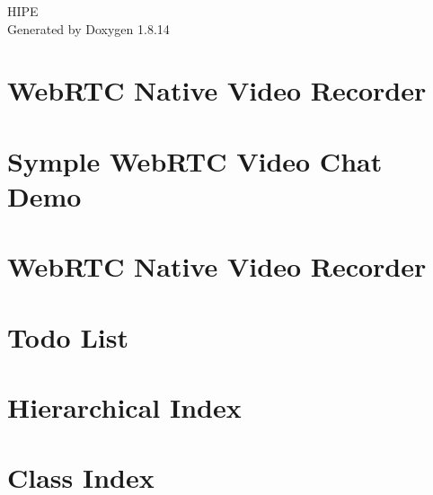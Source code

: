 \documentclass[twoside]{book}
\newcommand{\+}{\discretionary{\mbox{\scriptsize$\hookleftarrow$}}{}{}}
\newcommand{\clearemptydoublepage}{%
  \newpage{\pagestyle{empty}\cleardoublepage}%
}
\begin{document}
\hypersetup{pageanchor=false,
             bookmarksnumbered=true,
             pdfencoding=unicode
            }
\begin{titlepage}
\vspace*{7cm}
\begin{center}%
{\Large H\+I\+PE }\\
\vspace*{1cm}
{\large Generated by Doxygen 1.8.14}\\
\end{center}
\end{titlepage}
\clearemptydoublepage
{}
\tableofcontents
\clearemptydoublepage
{}
\hypersetup{pageanchor=true}

\chapter{Web\+R\+TC Native Video Recorder}
\label{md_source_webrtcrecorder__r_e_a_d_m_e}

\chapter{Symple Web\+R\+TC Video Chat Demo}
\label{md_source_webrtcstreamer_client__r_e_a_d_m_e}

\chapter{Web\+R\+TC Native Video Recorder}
\label{md_source_webrtcstreamer__r_e_a_d_m_e}

\chapter{Todo List}
\label{todo}

\chapter{Hierarchical Index}

\chapter{Class Index}

\end{document}
